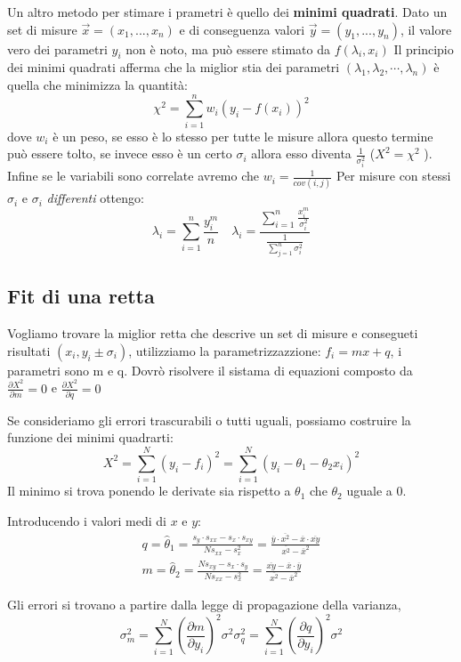 \documentclass{article}
\begin{document}
Un altro metodo per stimare i prametri è quello dei \textbf{minimi quadrati}. Dato un set di misure $\vec{x}=(x_1,..., x_n)$ e di conseguenza valori $\vec{y}=(y_1,..., y_n)$, il valore vero 
dei parametri $y_i$ non è noto, ma può essere stimato da $f(\lambda_i,x_i)$ Il principio dei minimi quadrati afferma che la miglior stia dei parametri $(\lambda_1, \lambda_2, \cdots, \lambda_n)$ è quella che minimizza la quantità:
\[
\chi^2=\sum_{i=1}^{n}w_i(y_i-f(x_i))^2
\]
dove $w_i$ è un peso, se esso è lo stesso per tutte le misure allora questo termine può essere tolto, se invece esso è un certo $\sigma_i$ allora esso diventa $\frac{1}{\sigma_i^2}$ ($X^2 = \chi^ 2$ ). Infine se le variabili sono correlate avremo che $w_i=\frac{1}{cov(i,j)}$
Per misure con stessi $\sigma_i$ e $\sigma_i$ \textit{differenti} ottengo:
\[  
\lambda_i=\sum_{i=1}^n \frac{y_i^m}{n} \quad  \lambda_i=\frac{\sum_{i=1}^n \frac{x_i^m}{\sigma_i^2} }{\frac{1}{\sum_{j=1}^{n}\sigma_i^2}}
\]

\subsection{Fit di una retta}
Vogliamo trovare la miglior retta che descrive un set di misure e consegueti risultati $(x_i,y_i \pm \sigma_i)$, 
utilizziamo la parametrizzazzione: $f_i=mx+q$, i parametri sono m e q. Dovrò risolvere il sistama di equazioni
composto da $\frac{\partial X^2}{\partial m}=0$ e $\frac{\partial X^2}{\partial q}=0$

Se consideriamo gli errori trascurabili o tutti uguali, possiamo costruire la funzione dei minimi quadrarti:
\[
X^2=\sum_{i=1}^{N}{(y_i-f_i)}^2=\sum_{i=1}^{N}{(y_i-\theta_1-\theta_2 x_i)}^2
\]
Il minimo si trova ponendo le derivate sia rispetto a $\theta_1$ che $\theta_2$ uguale a 0.

Introducendo i valori medi di $x$ e $y$:
\begin{equation*} 
    \begin{split}
q = \hat{\theta}_1 = \frac{s_y \cdot s_{xx} - s_x \cdot s_{xy}}{N s_{xx} - s_x^2} = \frac{\overline{y} \cdot \overline{x^2} - \overline{x} \cdot \overline{xy}}{\overline{x^2} - \overline{x}^2}
\\
m = \hat{\theta}_2 = \frac{N s_{xy} - s_x \cdot s_y}{N s_{xx} - s_x^2} = \frac{\overline{xy} - \overline{x} \cdot \overline{y}}{\overline{x^2} - \overline{x}^2}
   \end{split}
\end{equation*}

Gli errori si trovano a partire dalla legge di propagazione della varianza, 
\begin{equation*}
\sigma_{{m}}^2 = \sum_{i=1}^N \left( \frac{\partial m}{\partial y_i} \right)^2 \sigma^2
\sigma_{q}^2 = \sum_{i=1}^N \left( \frac{\partial q}{\partial y_i} \right)^2 \sigma^2
\end{equation*}
\end{document}
